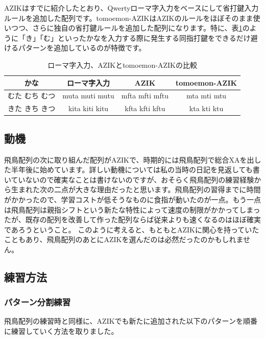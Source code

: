AZIKはすでに紹介したとおり、Qwertyローマ字入力をベースにして省打鍵入力ルールを追加した配列です。tomoemon-AZIKはAZIKのルールをほぼそのまま使いつつ、さらに独自の省打鍵ルールを追加した配列になります。特に、表\ref{tomoemon:compare_roman_azik_tomoemon_azik}のように「き」「む」といったかなを入力する際に発生する同指打鍵をできるだけ避けるパターンを追加しているのが特徴です。
\begin{table}
\begin{center}
\caption{ローマ字入力、AZIKとtomoemon-AZIKの比較}
\label{tomoemon:compare_roman_azik_tomoemon_azik}
\begin{tabular}{cccc}
\hline
かな & ローマ字入力 & AZIK & tomoemon-AZIK \\
\hline
むた むち むつ & muta muti mutu & mfta mfti mftu & mta mti mtu \\
きた きち きつ & kita kiti kitu & kfta kfti kftu & kta kti ktu \\
\hline
\end{tabular}
\end{center}
\end{table}


\subsection{動機}

飛鳥配列の次に取り組んだ配列がAZIKで、時期的には飛鳥配列で総合XAを出した半年後に始めています。詳しい動機については私の当時の日記を見返しても書いていないので確実なことは書けないのですが、おそらく飛鳥配列の練習経験から生まれた次の二点が大きな理由だったと思います。飛鳥配列の習得までに時間がかかったので、学習コストが低そうなものに食指が動いたのが一点。もう一点は飛鳥配列は親指シフトという新たな特性によって速度の制限がかかってしまったが、既存の配列を改善して作った配列ならば従来よりも速くなるのはほぼ確実であろうということ。
このように考えると、もともとAZIKに関心を持っていたこともあり、飛鳥配列のあとにAZIKを選んだのは必然だったのかもしれません。

\subsection{練習方法}

\subsubsection*{パターン分割練習}
飛鳥配列の練習時と同様に、AZIKでも新たに追加された以下のパターンを順番に練習していく方法を取りました。

